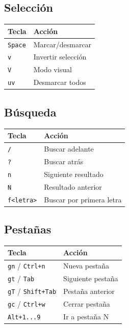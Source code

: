 \documentclass[
  doc,
  floatsintext,
  longtable,
  a4paper,
  nolmodern,
  notxfonts,
  notimes,
  12pt,
  colorlinks=true,linkcolor=blue,citecolor=blue,urlcolor=blue]{apa7}
\newcounter{none} %
\begin{document}
\subsection{Selección}\label{selecciuxf3n}

{\def\LTcaptype{none} %
\begin{longtable}[]{@{}ll@{}}
\toprule\noalign{}
Tecla & Acción \\
\midrule\noalign{}
\endhead
\bottomrule\noalign{}
\endlastfoot
\texttt{Space} & Marcar/desmarcar \\
\texttt{v} & Invertir selección \\
\texttt{V} & Modo visual \\
\texttt{uv} & Desmarcar todos \\
\end{longtable}
}

\subsection{Búsqueda}\label{buxfasqueda-2}

{\def\LTcaptype{none} %
\begin{longtable}[]{@{}ll@{}}
\toprule\noalign{}
Tecla & Acción \\
\midrule\noalign{}
\endhead
\bottomrule\noalign{}
\endlastfoot
\texttt{/} & Buscar adelante \\
\texttt{?} & Buscar atrás \\
\texttt{n} & Siguiente resultado \\
\texttt{N} & Resultado anterior \\
\texttt{f\textless{}letra\textgreater{}} & Buscar por primera letra \\
\end{longtable}
}

\subsection{Pestañas}\label{pestauxf1as}

{\def\LTcaptype{none} %
\begin{longtable}[]{@{}ll@{}}
\toprule\noalign{}
Tecla & Acción \\
\midrule\noalign{}
\endhead
\bottomrule\noalign{}
\endlastfoot
\texttt{gn} / \texttt{Ctrl+n} & Nueva pestaña \\
\texttt{gt} / \texttt{Tab} & Siguiente pestaña \\
\texttt{gT} / \texttt{Shift+Tab} & Pestaña anterior \\
\texttt{gc} / \texttt{Ctrl+w} & Cerrar pestaña \\
\texttt{Alt+1...9} & Ir a pestaña N \\
\end{longtable}
}
\end{document}
